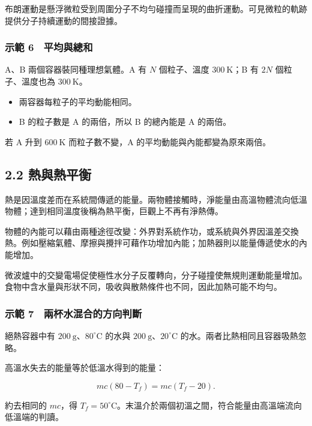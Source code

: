 \documentclass[11pt,a4paper]{article}
\providecommand{\tightlist}{%
  \setlength{\itemsep}{0pt}\setlength{\parskip}{0pt}}
\begin{document}
布朗運動是懸浮微粒受到周圍分子不均勻碰撞而呈現的曲折運動。可見微粒的軌跡提供分子持續運動的間接證據。

\subsubsection{示範 6　平均與總和}\label{ux793aux7bc4-6-ux5e73ux5747ux8207ux7e3dux548c}

A、B 兩個容器裝同種理想氣體。A 有 \(N\) 個粒子、溫度 \(300\ \mathrm K\)；B 有 \(2N\) 個粒子、溫度也為 \(300\ \mathrm K\)。

\begin{itemize}
\tightlist
\item
  兩容器每粒子的平均動能相同。
\item
  B 的粒子數是 A 的兩倍，所以 B 的總內能是 A 的兩倍。
\end{itemize}

若 A 升到 \(600\ \mathrm K\) 而粒子數不變，A 的平均動能與內能都變為原來兩倍。

\subsection{2.2 熱與熱平衡}\label{ux71b1ux8207ux71b1ux5e73ux8861}

熱是因溫度差而在系統間傳遞的能量。兩物體接觸時，淨能量由高溫物體流向低溫物體；達到相同溫度後稱為熱平衡，巨觀上不再有淨熱傳。

物體的內能可以藉由兩種途徑改變：外界對系統作功，或系統與外界因溫差交換熱。例如壓縮氣體、摩擦與攪拌可藉作功增加內能；加熱器則以能量傳遞使水的內能增加。

微波爐中的交變電場促使極性水分子反覆轉向，分子碰撞使無規則運動能量增加。食物中含水量與形狀不同，吸收與散熱條件也不同，因此加熱可能不均勻。

\subsubsection{示範 7　兩杯水混合的方向判斷}\label{ux793aux7bc4-7-ux5169ux676fux6c34ux6df7ux5408ux7684ux65b9ux5411ux5224ux65b7}

絕熱容器中有 \(200\ \mathrm g\)、\(80^\circ\mathrm C\) 的水與 \(200\ \mathrm g\)、\(20^\circ\mathrm C\) 的水。兩者比熱相同且容器吸熱忽略。

高溫水失去的能量等於低溫水得到的能量：

\[
mc(80-T_f)=mc(T_f-20).
\]

約去相同的 \(mc\)，得 \(T_f=50^\circ\mathrm C\)。末溫介於兩個初溫之間，符合能量由高溫端流向低溫端的判讀。
\end{document}
